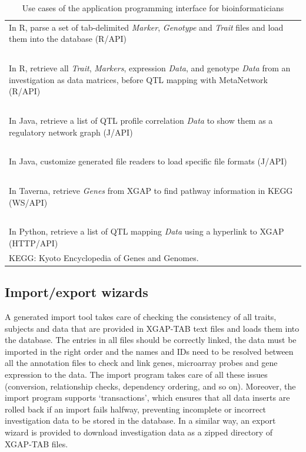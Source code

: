 \begin{table}
\begin{tabulary}{\linewidth}{L}
  \hline
  In R, parse a set of tab-delimited \textsl{Marker}, \textsl{Genotype} and \textsl{Trait} files and load them into the database (R/API)\\
  ~\\
  In R, retrieve all \textsl{Trait}, \textsl{Markers}, expression \textsl{Data}, and genotype \textsl{Data} from an investigation as data matrices, before QTL mapping with MetaNetwork (R/API)\\
  ~\\
  In Java, retrieve a list of QTL profile correlation \textsl{Data} to show them as a regulatory network graph (J/API)\\
  ~\\
  In Java, customize generated file readers to load specific file formats (J/API)\\
  ~\\
  In Taverna, retrieve \textsl{Genes} from XGAP to find pathway information in KEGG (WS/API)\\
  ~\\
  In Python, retrieve a list of QTL mapping \textsl{Data} using a hyperlink to XGAP (HTTP/API)\\
  \hline
  {\footnotesize KEGG: Kyoto Encyclopedia of Genes and Genomes.}\\
\end{tabulary}
\caption[Use cases of the application programming interface]{Use cases of the application programming interface for bioinformaticians}
\label{table:xgap_api_usecases}
\end{table}

\subsection{Import/export wizards}
A generated import tool takes care of checking the consistency of all traits, subjects and data that are provided in XGAP-TAB text files and loads them into the database.
The entries in all files should be correctly linked, the data must be imported in the right order and the names and IDs need to be resolved between all the annotation files to check and link genes, microarray probes and gene expression to the data.
The import program takes care of all these issues (conversion, relationship checks, dependency ordering, and so on).
Moreover, the import program supports ‘transactions’, which ensures that all data inserts are rolled back if an import fails halfway, preventing incomplete or incorrect investigation data to be stored in the database.
In a similar way, an export wizard is provided to download investigation data as a zipped directory of XGAP-TAB files.

